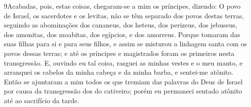 \medskip

\lettrine{9} Acabadas, pois, estas coisas, chegaram-se a mim
os príncipes, dizendo: O povo de Israel, os sacerdotes e os levitas,
não se têm separado dos povos destas terras, seguindo as abominações
dos cananeus, dos heteus, dos perizeus, dos jebuseus, dos amonitas,
dos moabitas, dos egípcios, e dos amorreus. Porque tomaram das
suas filhas para si e para seus filhos, e assim se misturou a
linhagem santa com os povos dessas terras; e até os príncipes e
magistrados foram os primeiros nesta transgressão. E, ouvindo eu
tal coisa, rasguei as minhas vestes e o meu manto, e arranquei os
cabelos da minha cabeça e da minha barba, e sentei-me atônito.
Então se ajuntaram a mim todos os que tremiam das palavras do
Deus de Israel por causa da transgressão dos do cativeiro; porém eu
permaneci sentado atônito até ao sacrifício da tarde.


